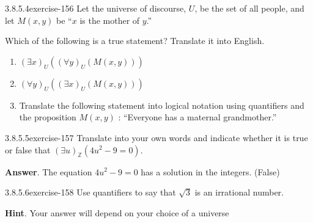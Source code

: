 \documentclass[twoside,10pt,]{book}
\numberwithin{equation}{section}
\begin{document}
\begin{divisionsolution}{3.8.5.4}{}{exercise-156}%
\hypertarget{p-1428}{}%
Let the universe of discourse, \(U\), be the set of all people, and let \(M(x, y)\) be ``\(x\) is the mother of \(y\).''%
\par
\hypertarget{p-1429}{}%
Which of the following is a true statement? Translate it into English.%
\par
\hypertarget{p-1430}{}%
\leavevmode%
\begin{enumerate}[label=(\alph*)]
\item\hypertarget{li-790}{}\hypertarget{p-1431}{}%
\((\exists  x)_U((\forall y)_U(M(x,y)))\)%
\item\hypertarget{li-791}{}\hypertarget{p-1432}{}%
\((\forall y)_U((\exists  x)_U(M(x,y)))\)%
\item\hypertarget{li-792}{}\hypertarget{p-1433}{}%
Translate the following statement into logical notation using quantifiers and the proposition \(M(x, y)\) :  ``Everyone has a maternal grandmother.''%
\end{enumerate}
%
\end{divisionsolution}%
\begin{divisionsolution}{3.8.5.5}{}{exercise-157}%
\hypertarget{p-1434}{}%
Translate into your own words and indicate whether it is true or false that \((\exists u) _{\mathbb{Z}} (4 u^2 -9 = 0)\).%
\par\smallskip%
\noindent\textbf{Answer}.\quad%
\hypertarget{p-1435}{}%
The equation \(4u^2-9=0\) has a solution in the integers. (False)%
\end{divisionsolution}%
\begin{divisionsolution}{3.8.5.6}{}{exercise-158}%
\hypertarget{p-1436}{}%
Use quantifiers to say that \(\sqrt{3}\) is an irrational number.%
\par\smallskip%
\noindent\textbf{Hint}.\quad%
\hypertarget{p-1437}{}%
Your answer will depend on your choice of a universe%
\end{divisionsolution}%
\end{document}
